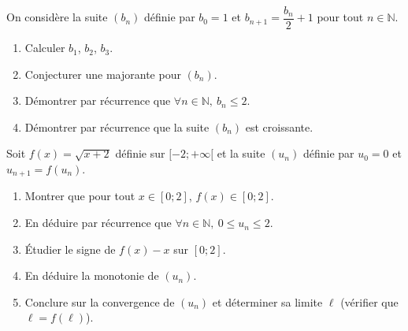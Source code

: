 \documentclass[11pt]{article}
\begin{document}
\begin{exercice}
On considère la suite $(b_n)$ définie par $b_0 = 1$ et $b_{n+1} = \dfrac{b_n}{2} + 1$ pour tout $n \in \mathbb{N}$.
\begin{enumerate}
    \item Calculer $b_1$, $b_2$, $b_3$.
    \item Conjecturer une majorante pour $(b_n)$.
    \item Démontrer par récurrence que $\forall n \in \mathbb{N},\ b_n \leq 2$.
    \item Démontrer par récurrence que la suite $(b_n)$ est croissante.
\end{enumerate}
\end{exercice}

\begin{exercice}[Suite définie par récurrence : $u_{n+1} = f(u_n)$]
Soit $f(x) = \sqrt{x+2}$ définie sur $[-2; +\infty[$ et la suite $(u_n)$ définie par $u_0 = 0$ et $u_{n+1} = f(u_n)$.
\begin{enumerate}
    \item Montrer que pour tout $x \in [0; 2]$, $f(x) \in [0; 2]$.
    \item En déduire par récurrence que $\forall n \in \mathbb{N},\ 0 \leq u_n \leq 2$.
    \item Étudier le signe de $f(x) - x$ sur $[0; 2]$.
    \item En déduire la monotonie de $(u_n)$.
    \item Conclure sur la convergence de $(u_n)$ et déterminer sa limite $\ell$ (vérifier que $\ell = f(\ell)$).
\end{enumerate}
\end{exercice}
\end{document}
